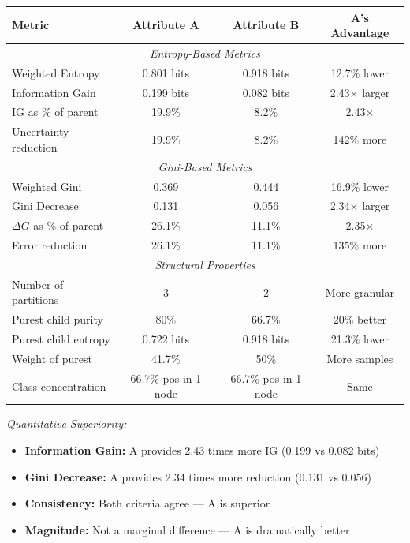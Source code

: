 \documentclass[12pt]{article}
\begin{document}
\begin{explanation}
\begin{center}
\begin{tabular}{|l|c|c|c|}
\hline
\textbf{Metric} & \textbf{Attribute A} & \textbf{Attribute B} & \textbf{A's Advantage} \\
\hline
\multicolumn{4}{|c|}{\textit{Entropy-Based Metrics}} \\
\hline
Weighted Entropy & 0.801 bits & 0.918 bits & 12.7\% lower \\
Information Gain & 0.199 bits & 0.082 bits & 2.43$\times$ larger \\
IG as \% of parent & 19.9\% & 8.2\% & 2.43$\times$ \\
Uncertainty reduction & 19.9\% & 8.2\% & 142\% more \\
\hline
\multicolumn{4}{|c|}{\textit{Gini-Based Metrics}} \\
\hline
Weighted Gini & 0.369 & 0.444 & 16.9\% lower \\
Gini Decrease & 0.131 & 0.056 & 2.34$\times$ larger \\
$\Delta G$ as \% of parent & 26.1\% & 11.1\% & 2.35$\times$ \\
Error reduction & 26.1\% & 11.1\% & 135\% more \\
\hline
\multicolumn{4}{|c|}{\textit{Structural Properties}} \\
\hline
Number of partitions & 3 & 2 & More granular \\
Purest child purity & 80\% & 66.7\% & 20\% better \\
Purest child entropy & 0.722 bits & 0.918 bits & 21.3\% lower \\
Weight of purest & 41.7\% & 50\% & More samples \\
Class concentration & 66.7\% pos in 1 node & 66.7\% pos in 1 node & Same \\
\hline
\end{tabular}
\end{center}

\textit{Quantitative Superiority:}

\begin{itemize}
    \item \textbf{Information Gain:} A provides 2.43 times more IG (0.199 vs 0.082 bits)
    \item \textbf{Gini Decrease:} A provides 2.34 times more reduction (0.131 vs 0.056)
    \item \textbf{Consistency:} Both criteria agree — A is superior
    \item \textbf{Magnitude:} Not a marginal difference — A is dramatically better
\end{itemize}


\end{explanation}
\end{document}

